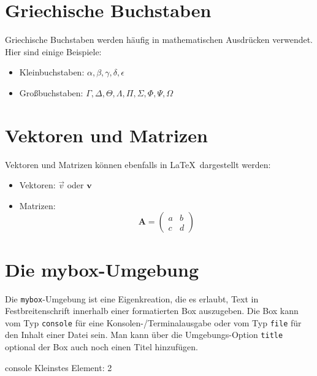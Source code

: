 \section{Griechische Buchstaben}

Griechische Buchstaben werden häufig in mathematischen Ausdrücken verwendet.
Hier sind einige Beispiele:

\begin{itemize}
    \item Kleinbuchstaben: \(\alpha, \beta, \gamma, \delta, \epsilon\)
    \item Großbuchstaben: \(\Gamma, \Delta, \Theta, \Lambda, \Pi, \Sigma, \Phi,
    \Psi, \Omega\)
\end{itemize}

\section{Vektoren und Matrizen}

Vektoren und Matrizen können ebenfalls in \LaTeX\ dargestellt werden:

\begin{itemize}
    \item Vektoren: \(\vec{v}\) oder \(\mathbf{v}\)
    \item Matrizen: 
    \begin{equation}
    \mathbf{A} = \begin{pmatrix}
    a & b \\
    c & d
    \end{pmatrix}
    \end{equation}
\end{itemize}



\section{Die mybox-Umgebung}

Die \texttt{mybox}-Umgebung ist eine Eigenkreation, die es erlaubt, Text in
Festbreitenschrift innerhalb einer formatierten Box auszugeben. Die Box kann vom
Typ \texttt{console} für eine Konsolen-/Terminalausgabe oder vom Typ
\texttt{file} für den Inhalt einer Datei sein. Man kann über die Umgebungs-Option
\texttt{title} optional der Box auch noch einen Titel hinzufügen.

\begin{mybox}[Bildschirmausgabe]{console}
  Kleinstes Element: 2
\end{mybox}

